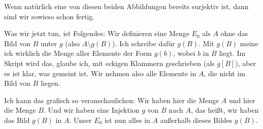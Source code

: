 

\begin{math-stroke}
\end{math-stroke}

\begin{spoken-clean}[00:24:22 - 00:26:00]
Wenn natürlich eine von diesen beiden Abbildungen bereits surjektiv ist, dann sind wir sowieso schon fertig. 

Was wir jetzt tun, ist Folgendes: Wir definieren eine Menge $E_0$ als $A$ ohne das Bild von $B$ unter $g$ (also $A \setminus g(B)$). Ich schreibe dafür $g(B)$. Mit $g(B)$ meine ich wirklich die Menge aller Elemente der Form $g(b)$, wobei $b$ in $B$ liegt. Im Skript wird das, glaube ich, mit eckigen Klammern geschrieben (als $g[B]$), aber es ist klar, was gemeint ist. Wir nehmen also alle Elemente in $A$, die nicht im Bild von $B$ liegen.

Ich kann das grafisch so veranschaulichen: Wir haben hier die Menge $A$ und hier die Menge $B$. Und wir haben eine Injektion $g$ von $B$ nach $A$, das heißt, wir haben das Bild $g(B)$ in $A$. Unser $E_0$ ist nun alles in $A$ außerhalb dieses Bildes $g(B)$.
\end{spoken-clean}

